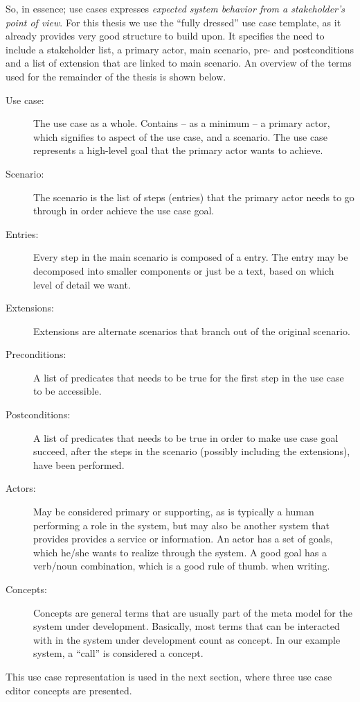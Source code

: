 So, in essence; use cases expresses \emph{expected system behavior from a stakeholder's point of view}. For this thesis we use the ``fully dressed'' use case template\cite{larman2005}, as it already provides very good structure to build upon. It specifies the need to include a stakeholder list, a primary actor, main scenario, pre- and postconditions and a list of extension that are linked to main scenario. An overview of the terms used for the remainder of the thesis is shown below.
\begin{description}
  \item[Use case:] The use case as a whole. Contains -- as a minimum -- a primary actor, which signifies to aspect of the use case, and a scenario. The use case represents a high-level goal that the primary actor wants to achieve.
  \item[Scenario:] The scenario is the list of steps (entries) that the primary actor needs to go through in order achieve the use case goal.
  \item[Entries:] Every step in the main scenario is composed of a entry. The entry may be decomposed into smaller components or just be a text, based on which level of detail we want. 
  \item[Extensions:] Extensions are alternate scenarios that branch out of the original scenario. 
  \item[Preconditions:] A list of predicates that needs to be true for the first step in the use case to be accessible.
  \item[Postconditions:] A list of predicates that needs to be true in order to make use case goal succeed, after the steps in the scenario (possibly including the extensions), have been performed.
  \item[Actors:] May be considered primary or supporting, as is typically a human performing a role in the system, but may also be another system that provides provides a service or information. An actor has a set of goals, which he/she wants to realize through the system. A good goal has a verb/noun combination, which is a good rule of thumb. when writing.
  \item[Concepts:] Concepts are general terms that are usually part of the meta model for the system under development. Basically, most terms that can be interacted with in the system under development count as concept. In our example system, a ``call'' is considered a concept.
\end{description}
This use case representation is used in the next section, where three use case editor concepts are presented.




